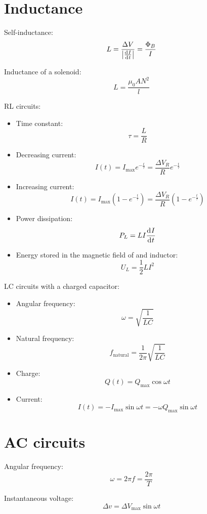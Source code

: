 \documentclass[10pt, twocolumn]{article}
\begin{document}
\section{Inductance}
Self-inductance:
\[
  L = \frac{\Delta V}{\left| \frac{\mathrm{d}^{} I}{\mathrm{d}^{} t} \right|} = \frac{\Phi_B }{I}
\]

Inductance of a solenoid:
\[
  L = \frac{\mu_0 AN^2 }{l}
\]

RL circuits:
\begin{itemize}
  \item Time constant:
        \[
          \tau = \frac{L}{R}
        \]
  \item Decreasing current:
        \[
          I\left( t \right) = I_{\mathrm{max}}e^{-\frac{t}{\tau}} = \frac{\Delta V_R }{R}e^{-\frac{t}{\tau}}
        \]
  \item Increasing current:
        \[
          I\left( t \right) = I_{\mathrm{max}}\left( 1 - e^{-\frac{t}{\tau}} \right) = \frac{\Delta V_R }{R}\left( 1 - e^{-\frac{t}{\tau}} \right)
        \]
  \item Power dissipation:
        \[
          P_L = LI\frac{\mathrm{d}^{} I}{\mathrm{d}^{} t}
        \]
  \item Energy stored in the magnetic field of and inductor:
        \[
          U_L = \frac{1}{2}LI^2
        \]
\end{itemize}

LC circuits with a charged capacitor:
\begin{itemize}
  \item Angular frequency:
        \[
          \omega = \sqrt{\frac{1}{LC}}
        \]
  \item Natural frequency:
        \[
          f_{\mathrm{natural}} = \frac{1}{2\pi}\sqrt{\frac{1}{LC}}
        \]
  \item Charge:
        \[
          Q\left( t \right) = Q_{\mathrm{max}}\cos{\omega t}
        \]
  \item Current:
        \[
          I\left( t \right) = - I_{\mathrm{max}}\sin{\omega t} = - \omega Q_{\mathrm{max}}\sin{\omega t}
        \]
\end{itemize}

\section{AC circuits}
Angular frequency:
\[
  \omega = 2\pi f = \frac{2\pi}{T}
\]

Instantaneous voltage:
\[
  \Delta v = \Delta V_{\mathrm{max}}\sin{\omega t}
\]
\end{document}
